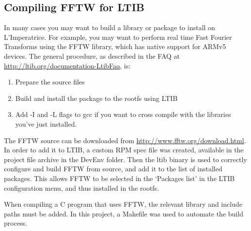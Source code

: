 	\subsection{Compiling FFTW for LTIB} %
	\label{apdx:compiling_fftw_for_ltib}
		In many cases you may want to build a library or package to install on L'Imperatrice.  For example, you may want to perform real time Fast Fourier Transforms using the FFTW library, which has native support for ARMv5 devices.  The general procedure, as described in the FAQ at \href{http://ltib.org/documentation-LtibFaq}{http://ltib.org/documentation-LtibFaq}, is:
		\begin{enumerate}
			\item Prepare the source files
			\item Build and install the package to the rootfs using LTIB
			\item Add -I and -L flags to gcc if you want to cross compile with the libraries you've just installed.
		\end{enumerate}

		The FFTW source can be downloaded from \href{http://www.fftw.org/download.html}{http://www.fftw.org/download.html}.  In order to add it to LTIB, a custom RPM spec file was created, available in the project file archive in the DevEnv folder.  Then the ltib binary is used to correctly configure and build FFTW from source, and add it to the list of installed packages.  This allows FFTW to be selected in the `Packages list' in the LTIB configuration menu, and thus installed in the rootfs.

		When compiling a C program that uses FFTW, the relevant library and include paths must be added.  In this project, a Makefile was used to automate the build process.


